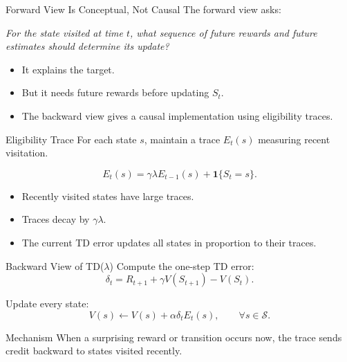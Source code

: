 \documentclass[aspectratio=169]{beamer}
\newcommand{\one}{\mathbf{1}}
\newcommand{\Sspace}{\mathcal{S}}
\begin{document}
\begin{frame}{Forward View Is Conceptual, Not Causal}
\small
The forward view asks:

\vspace{0.3em}
\begin{center}
\emph{For the state visited at time $t$, what sequence of future rewards and future estimates should determine its update?}
\end{center}

\vspace{0.8em}
\begin{itemize}
    \item It explains the target.
    \item But it needs future rewards before updating $S_t$.
    \item The backward view gives a causal implementation using eligibility traces.
\end{itemize}
\end{frame}

\begin{frame}{Eligibility Trace}
\small
For each state $s$, maintain a trace $E_t(s)$ measuring recent visitation.

\[
E_t(s)=\gamma\lambda E_{t-1}(s)+\one\{S_t=s\}.
\]

\vspace{0.8em}
\begin{itemize}
    \item Recently visited states have large traces.
    \item Traces decay by $\gamma\lambda$.
    \item The current TD error updates all states in proportion to their traces.
\end{itemize}
\end{frame}

\begin{frame}{Backward View of TD($\lambda$)}
\small
Compute the one-step TD error:
\[
\delta_t=R_{t+1}+\gamma V(S_{t+1})-V(S_t).
\]

Update every state:
\[
V(s)\leftarrow V(s)+\alpha\delta_t E_t(s),
\qquad \forall s\in\Sspace.
\]

\vspace{0.8em}
\begin{block}{Mechanism}
When a surprising reward or transition occurs now, the trace sends credit backward to states visited recently.
\end{block}
\end{frame}
\end{document}
